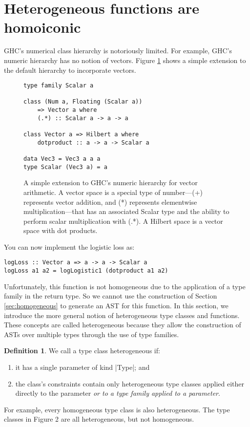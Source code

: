 \documentclass[preprint]{sigplanconf}
\theoremstyle{definition}
\newtheorem{defn}{Definition}
\begin{document}
\section{Heterogeneous functions are homoiconic}

GHC's numerical class hierarchy is notoriously limited.
For example, GHC's numeric hierarchy has no notion of vectors.
Figure \ref{code:vector} shows a simple extension to the default hierarchy to incorporate vectors.

\begin{figure}
\begin{lstlisting}
type family Scalar a

class (Num a, Floating (Scalar a))
    => Vector a where
    (.*) :: Scalar a -> a -> a

class Vector a => Hilbert a where
    dotproduct :: a -> a -> Scalar a

data Vec3 = Vec3 a a a
type Scalar (Vec3 a) = a
\end{lstlisting}
\caption{
    A simple extension to GHC's numeric hierarchy for vector arithmetic.
    A vector space is a special type of number---{\ttfamily (+)} represents vector addition, and {\ttfamily (*)} represents elementwise multiplication---that has an associated {\ttfamily Scalar} type and the ability to perform scalar multiplication with {\ttfamily (.*)}.
    A Hilbert space is a vector space with dot products.
}
\label{code:vector}
\end{figure}

You can now implement the logistic loss as:
\begin{lstlisting}
logLoss :: Vector a => a -> a -> Scalar a
logLoss a1 a2 = logLogistic1 (dotproduct a1 a2)
\end{lstlisting}
Unfortunately, this function is not homogeneous due to the application of a type family in the return type.
So we cannot use the construction of Section \ref{sec:homogeneous} to generate an AST for this function.
In this section, we introduce the more general notion of heterogeneous type classes and functions.
These concepts are called heterogeneous because they allow the construction of ASTs over multiple types through the use of type families.

\begin{defn}
We call a type class heterogeneous if:
\begin{enumerate}
\item
it has a single parameter of kind |Type|; and
\item
the class's constraints contain only heterogeneous type classes applied either directly to the parameter \emph{or to a type family applied to a parameter}.
\end{enumerate}
For example, every homogeneous type class is also heterogeneous.
The type classes in Figure 2 are all heterogeneous, but not homogeneous.
\end{defn}
\end{document}
